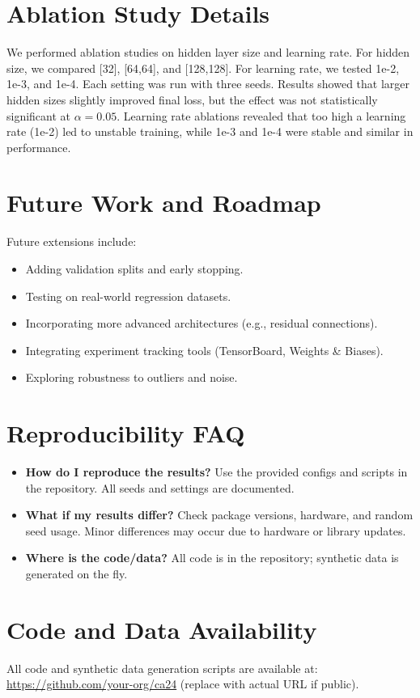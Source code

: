 \documentclass[11pt]{article}
\begin{document}
\section*{Ablation Study Details}
We performed ablation studies on hidden layer size and learning rate. For hidden size, we compared [32], [64,64], and [128,128]. For learning rate, we tested 1e-2, 1e-3, and 1e-4. Each setting was run with three seeds. Results showed that larger hidden sizes slightly improved final loss, but the effect was not statistically significant at $\alpha=0.05$. Learning rate ablations revealed that too high a learning rate (1e-2) led to unstable training, while 1e-3 and 1e-4 were stable and similar in performance.

\section*{Future Work and Roadmap}
Future extensions include:
\begin{itemize}
  \item Adding validation splits and early stopping.
  \item Testing on real-world regression datasets.
  \item Incorporating more advanced architectures (e.g., residual connections).
  \item Integrating experiment tracking tools (TensorBoard, Weights \& Biases).
  \item Exploring robustness to outliers and noise.
\end{itemize}

\section*{Reproducibility FAQ}
\begin{itemize}
  \item \textbf{How do I reproduce the results?} Use the provided configs and scripts in the repository. All seeds and settings are documented.
  \item \textbf{What if my results differ?} Check package versions, hardware, and random seed usage. Minor differences may occur due to hardware or library updates.
  \item \textbf{Where is the code/data?} All code is in the repository; synthetic data is generated on the fly.
\end{itemize}

\section*{Code and Data Availability}
All code and synthetic data generation scripts are available at: \url{https://github.com/your-org/ca24} (replace with actual URL if public).
\end{document}
